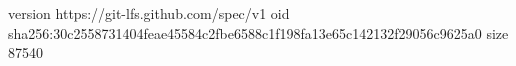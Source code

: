 version https://git-lfs.github.com/spec/v1
oid sha256:30c2558731404feae45584c2fbe6588c1f198fa13e65c142132f29056c9625a0
size 87540
